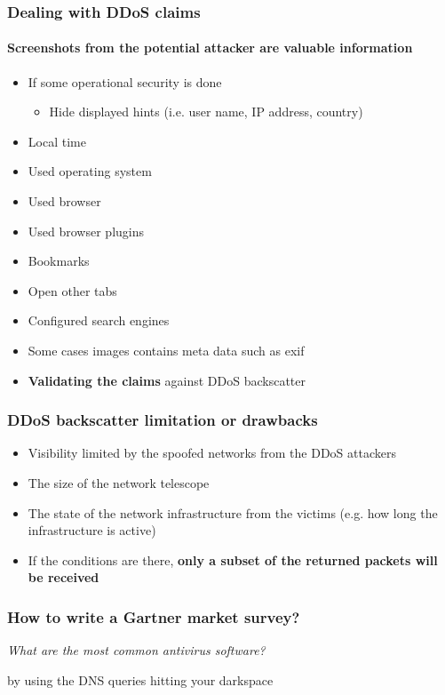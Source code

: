 \documentclass{beamer}
\begin{document}
\begin{frame}
    \frametitle{Dealing with DDoS claims}
    \framesubtitle{Screenshots from the potential attacker are valuable information}
    \begin{itemize}
        \item If some operational security is done
        \begin{itemize}
            \item Hide displayed hints (i.e. user name, IP address, country)
        \end{itemize}
        \item Local time
        \item Used operating system
        \item Used browser
        \item Used browser plugins
        \item Bookmarks
        \item Open other tabs
        \item Configured search engines
        \item Some cases images contains meta data such as exif
        \item {\bf Validating the claims} against DDoS backscatter
    \end{itemize}
\end{frame}

\begin{frame}
        \frametitle{DDoS backscatter limitation or drawbacks}
        \begin{itemize}
                \item Visibility limited by the spoofed networks from the DDoS attackers
                \item The size of the network telescope
                \item The state of the network infrastructure from the victims (e.g. how long the infrastructure is active)
                \item If the conditions are there, {\bf only a subset of the returned packets will be received}
        \end{itemize}
\end{frame}


\begin{frame}
\frametitle{How to write a Gartner market survey?}
        {\center \it \Huge What are the most common antivirus software?\\}
        \begin{flushright}
        by using the DNS queries hitting your darkspace
        \end{flushright}
\end{frame}
\end{document}
